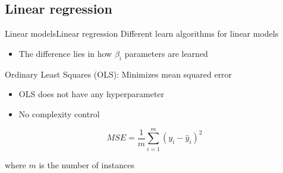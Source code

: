 \documentclass[10pt,compress]{beamer} %
\begin{document}
\subsection{Linear regression}
\begin{frame}{Linear models}{Linear regression}
    Different learn algorithms for linear models
    \begin{itemize}
        \item The difference lies in how $\beta_i$ parameters are learned
    \end{itemize}

	Ordinary Least Squares (OLS): Minimizes mean squared error
	\begin{itemize}
        \item OLS does not have any hyperparameter
        \item No complexity control
	\end{itemize}
    
    \begin{equation*}
    MSE = \frac{1}{m} \sum_{i=1}^m (y_i - \hat{y}_i)^2
    \end{equation*}

    where $m$ is the number of instances

\end{frame}
\end{document}
